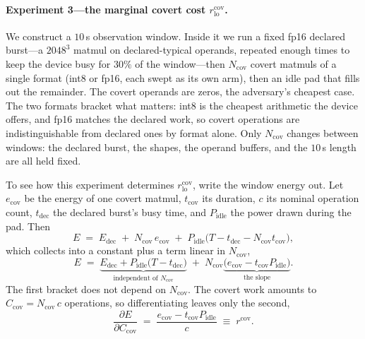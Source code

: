 \documentclass{article}
\theoremstyle{plain}
\theoremstyle{definition}
\theoremstyle{remark}
\begin{document}
\paragraph{Experiment 3---the marginal covert cost
$r_{\mathrm{lo}}^{\mathrm{cov}}$.}
We construct a $10$\,s observation window. Inside it we run a fixed fp16
declared burst---a $2048^3$ matmul on declared-typical operands, repeated
enough times to keep the device busy for $30\%$ of the window---then
$N_{\mathrm{cov}}$ covert matmuls of a single format (int8 or fp16, each swept
as its own arm), then an idle pad that
fills out the remainder. The covert operands are zeros, the adversary's
cheapest case. The two formats bracket what matters: int8 is the cheapest
arithmetic the device offers, and fp16 matches the declared work, so covert
operations are indistinguishable from declared ones by format alone. Only
$N_{\mathrm{cov}}$ changes between windows: the declared
burst, the shapes, the operand buffers, and the $10$\,s length are all held
fixed.

To see how this experiment determines $r_{\mathrm{lo}}^{\mathrm{cov}}$, write the window energy out. Let
$e_{\mathrm{cov}}$ be the energy of one covert matmul, $t_{\mathrm{cov}}$ its
duration, $c$ its nominal operation count, $t_{\mathrm{dec}}$ the declared
burst's busy time, and $P_{\mathrm{idle}}$ the power drawn during the pad. Then
\begin{equation}
	E \;=\; E_{\mathrm{dec}}
	\;+\; N_{\mathrm{cov}}\,e_{\mathrm{cov}}
	\;+\; P_{\mathrm{idle}}\bigl(T - t_{\mathrm{dec}}
	- N_{\mathrm{cov}} t_{\mathrm{cov}}\bigr),
	\label{eq:dosewindow}
\end{equation}
which collects into a constant plus a term linear in $N_{\mathrm{cov}}$,
\begin{equation}
	E \;=\; \underbrace{E_{\mathrm{dec}} + P_{\mathrm{idle}}
	\bigl(T - t_{\mathrm{dec}}\bigr)}_{\text{independent of }N_{\mathrm{cov}}}
	\;+\; N_{\mathrm{cov}}
	\underbrace{\bigl(e_{\mathrm{cov}}
	- t_{\mathrm{cov}}P_{\mathrm{idle}}\bigr)}_{\text{the slope}} .
	\label{eq:doseslope}
\end{equation}
The first bracket does not depend on $N_{\mathrm{cov}}$. The covert work
amounts to $C_{\mathrm{cov}} = N_{\mathrm{cov}}\,c$ operations, so
differentiating leaves only the second,
\begin{equation}
	\frac{\partial E}{\partial C_{\mathrm{cov}}}
	\;=\; \frac{e_{\mathrm{cov}} - t_{\mathrm{cov}}P_{\mathrm{idle}}}{c}
	\;\equiv\; r^{\mathrm{cov}} .
	\label{eq:doserate}
\end{equation}
\end{document}
